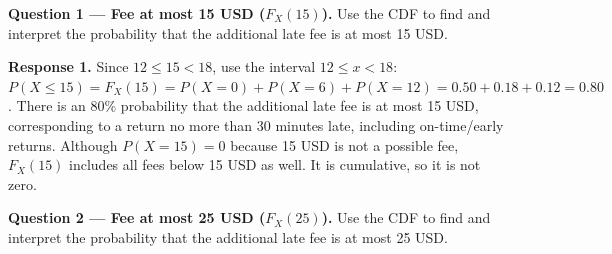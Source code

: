   \textbf{Question 1 --- Fee at most 15 USD ($F_X(15)$).} Use the CDF to find and interpret the probability
  that the additional late fee is at most 15 USD.

  \textbf{Response 1.} Since $12\leq15<18$, use the interval $12\leq x<18$:
  $P(X\leq15)=F_X(15)=P(X=0)+P(X=6)+P(X=12)=0.50+0.18+0.12=0.80$.
  There is an 80\% probability that the additional late fee is at most 15 USD, corresponding to a return
  no more than 30 minutes late, including on-time/early returns. Although $P(X=15)=0$ because 15 USD is
  not a possible fee, $F_X(15)$ includes all fees below 15 USD as well. It is cumulative, so it is not zero.

  \textbf{Question 2 --- Fee at most 25 USD ($F_X(25)$).} Use the CDF to find and interpret the probability
  that the additional late fee is at most 25 USD.

